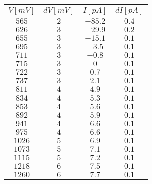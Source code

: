 \begin{tabular}{cccc}
\hline
	$V[mV]$ & $dV[mV]$ & $I[pA]$ & $dI[pA]$\\ 
\hline
	$565$ & $2$ & $-85.2$ & $0.4$ \\
	$626$ & $3$ & $-29.9$ & $0.2$ \\
	$655$ & $3$ & $-15.1$ & $0.1$ \\
	$695$ & $3$ & $-3.5$ & $0.1$ \\
	$711$ & $3$ & $-0.8$ & $0.1$ \\
	$715$ & $3$ & $0$ & $0.1$ \\
	$722$ & $3$ & $0.7$ & $0.1$ \\
	$737$ & $3$ & $2.1$ & $0.1$ \\
	$811$ & $4$ & $4.9$ & $0.1$ \\
	$834$ & $4$ & $5.3$ & $0.1$ \\
	$853$ & $4$ & $5.6$ & $0.1$ \\
	$892$ & $4$ & $5.9$ & $0.1$ \\
	$941$ & $4$ & $6.6$ & $0.1$ \\
	$975$ & $4$ & $6.6$ & $0.1$ \\
	$1026$ & $5$ & $6.9$ & $0.1$ \\
	$1073$ & $5$ & $7.1$ & $0.1$ \\
	$1115$ & $5$ & $7.2$ & $0.1$ \\
	$1218$ & $6$ & $7.5$ & $0.1$ \\
	$1260$ & $6$ & $7.7$ & $0.1$ \\
\hline
\end{tabular}

